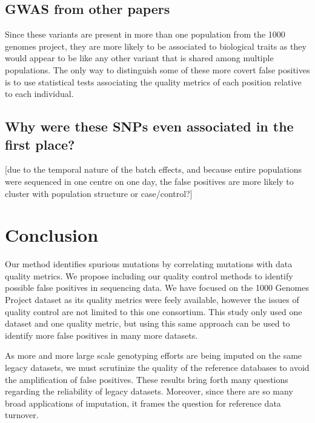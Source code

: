 \documentclass[12pt]{amsart}
\begin{document}
\subsection{GWAS from other papers}
Since these variants are present in more than one population from the 1000 genomes project, they are more likely to be associated to biological traits as they would appear to be like any other variant that is shared among multiple populations. 
The only way to distinguish some of these more covert false positives is to use statistical tests associating the quality metrics of each position relative to each individual. 
\subsection{Why were these SNPs even associated in the first place?}
[due to the temporal nature of the batch effects, and because entire populations were sequenced in one centre on one day, the false positives are more likely to cluster with population structure or case/control?]

			\section{Conclusion}
Our method identifies spurious mutations by correlating mutations with data quality metrics. 
We propose including our quality control methods to identify possible false positives in sequencing data. 
We have focused on the 1000 Genomes Project dataset as its quality metrics were feely available, however the issues of quality control are not limited to this one consortium. 
This study only used one dataset and one quality metric, but using this same approach can be used to identify more false positives in many more datasets. 

As more and more large scale genotyping efforts are being imputed on the same legacy datasets, we must scrutinize the quality of the reference databases to avoid the amplification of false positives. 
These results bring forth many questions regarding the reliability of legacy datasets. 
Moreover, since there are so many broad applications of imputation, it frames the question for reference data turnover. 
			
\end{document}
